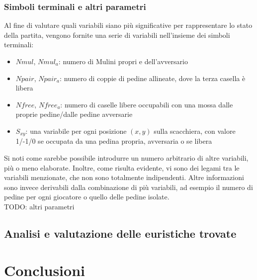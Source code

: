 \documentclass{../llncs}
\begin{document}
\subsubsection{Simboli terminali e altri parametri}
Al fine di valutare quali variabili siano più significative per rappresentare lo stato della partita, vengono fornite una serie di variabili nell'insieme dei simboli terminali:
\begin{itemize}
\item $Nmul$, $Nmul_a$: numero di Mulini propri e dell'avversario
\item $Npair$, $Npair_a$: numero di coppie di pedine allineate, dove la terza casella è libera
\item $Nfree$, $Nfree_a$: numero di caselle libere occupabili con una mossa dalle proprie pedine/dalle pedine avversarie
\item $S_{xy}$: una variabile per ogni posizione $(x,y)$ sulla scacchiera, con valore 1/-1/0 se occupata da una pedina propria, avversaria o se libera
\end{itemize}

Si noti come sarebbe possibile introdurre un numero arbitrario di altre variabili, più o meno elaborate. Inoltre, come risulta evidente, vi sono dei legami tra le variabili menzionate, che non sono totalmente indipendenti. Altre informazioni sono invece derivabili dalla combinazione di più variabili, ad esempio il numero di pedine per ogni giocatore o quello delle pedine isolate.\\

TODO: altri parametri %

\subsection{Analisi e valutazione delle euristiche trovate}

\section{Conclusioni}
\end{document}
